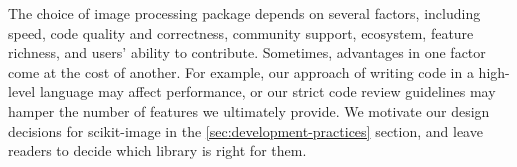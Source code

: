   The choice of image processing package depends on several factors, including
  speed, code quality and correctness, community support, ecosystem, feature
  richness, and users' ability to contribute. Sometimes, advantages in one
  factor come at the cost of another. For example, our approach of writing code
  in a high-level language may affect performance, or our strict code review
  guidelines may hamper the number of features we ultimately provide. We
  motivate our design decisions for scikit-image in the
  \ref{sec:development-practices} section, and leave readers to decide which
  library is right for them.
